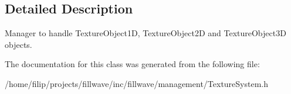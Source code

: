 \subsection{Detailed Description}
Manager to handle Texture\+Object1D, Texture\+Object2D and Texture\+Object3D objects. 

The documentation for this class was generated from the following file\+:\begin{DoxyCompactItemize}
\item 
/home/filip/projects/fillwave/inc/fillwave/management/Texture\+System.\+h\end{DoxyCompactItemize}
